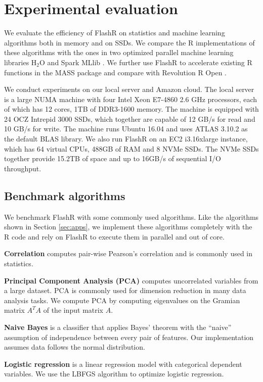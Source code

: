 \section{Experimental evaluation}
We evaluate the efficiency of FlashR on statistics and machine learning
algorithms both in memory and on SSDs. We compare the R implementations of
these algorithms with the ones in two optimized parallel machine learning
libraries H$_2$O \cite{h2o} and Spark MLlib \cite{mllib}. We further use FlashR
to accelerate existing R functions in the MASS package and compare with
Revolution R Open \cite{rro}.

We conduct experiments on our local server and Amazon cloud. The local server
is a large NUMA machine with four Intel Xeon E7-4860 2.6 GHz processors,
each of which has 12 cores, 1TB of DDR3-1600 memory. The machine is equipped
with 24 OCZ Intrepid 3000 SSDs, which together are capable of 12 GB/s for read
and 10 GB/s for write. The machine runs Ubuntu 16.04 and uses ATLAS 3.10.2 as
the default BLAS library. We also run FlashR on an EC2 i3.16xlarge instance,
which has 64 virtual CPUs, 488GB of RAM and 8 NVMe SSDs. The NVMe SSDs together
provide 15.2TB of space and up to 16GB/s of sequential I/O throughput.

\subsection{Benchmark algorithms}\label{benchalg}
We benchmark FlashR with some commonly used algorithms. Like the algorithms
shown in Section \ref{sec:apps}, we implement these algorithms completely with
the R code and rely on FlashR to execute them in parallel and out of core.

\noindent \textbf{Correlation} computes pair-wise Pearson's correlation
\cite{cor} and is commonly used in statistics.

\noindent \textbf{Principal Component Analysis (PCA)} computes uncorrelated
variables from a large dataset. PCA is commonly used for dimension reduction
in many data analysis tasks. We compute PCA by computing eigenvalues on the Gramian
matrix $A^T A$ of the input matrix $A$.

\noindent \textbf{Naive Bayes} is a classifier that applies Bayes' theorem
with the ``naive'' assumption of independence between every pair of features.
Our implementation assumes data follows the normal distribution.

\noindent \textbf{Logistic regression} is a linear regression model with
categorical dependent variables. We use the LBFGS algorithm \cite{lbfgs}
to optimize logistic regression.

